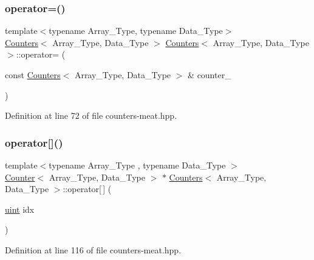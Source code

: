 \mbox{\label{class_counters_a0edeb22b0b1640f7ada1ef47a30ac486}} 
\subsubsection{\texorpdfstring{operator=()}{operator=()}}
{\footnotesize\ttfamily template$<$typename Array\+\_\+\+Type, typename Data\+\_\+\+Type$>$ \\
\hyperlink{class_counters}{Counters}$<$ Array\+\_\+\+Type, Data\+\_\+\+Type $>$ \hyperlink{class_counters}{Counters}$<$ Array\+\_\+\+Type, Data\+\_\+\+Type $>$\+::operator= (\begin{DoxyParamCaption}\item[{const \hyperlink{class_counters}{Counters}$<$ Array\+\_\+\+Type, Data\+\_\+\+Type $>$ \&}]{counter\+\_\+ }\end{DoxyParamCaption})}



Definition at line 72 of file counters-\/meat.\+hpp.

\mbox{\label{class_counters_a9c3ff72b5e24a299e3c1aecad0ea5eb2}} 
\subsubsection{\texorpdfstring{operator[]()}{operator[]()}}
{\footnotesize\ttfamily template$<$typename Array\+\_\+\+Type , typename Data\+\_\+\+Type $>$ \\
\hyperlink{class_counter}{Counter}$<$ Array\+\_\+\+Type, Data\+\_\+\+Type $>$ $\ast$ \hyperlink{class_counters}{Counters}$<$ Array\+\_\+\+Type, Data\+\_\+\+Type $>$\+::operator\mbox{[}$\,$\mbox{]} (\begin{DoxyParamCaption}\item[{\hyperlink{typedefs_8hpp_a91ad9478d81a7aaf2593e8d9c3d06a14}{uint}}]{idx }\end{DoxyParamCaption})\hspace{0.3cm}{\ttfamily [inline]}}



Definition at line 116 of file counters-\/meat.\+hpp.

\mbox{\label{class_counters_af213b17c55496b565ad6ce7a9b0a56e1}} 
